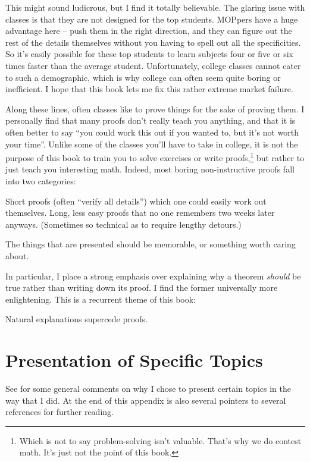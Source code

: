 This might sound ludicrous, but I find it totally believable.
The glaring issue with classes is that they are not designed for the top students.
MOPpers have a huge advantage here -- push them in the right direction,
and they can figure out the rest of the details themselves
without you having to spell out all the specificities.
So it's easily possible for these top students to learn subjects
four or five or six times faster than the average student.
Unfortunately, college classes cannot cater to such a demographic,
which is why college can often seem quite boring or inefficient.
I hope that this book lets me fix this rather extreme market failure.

Along these lines, often classes like to prove things for the sake of proving them.
I personally find that many proofs don't really teach you anything,
and that it is often better to say ``you could work this out if you wanted to, but it's not worth your time''.
Unlike some of the classes you'll have to take in college,
it is not the purpose of this book to train you to solve exercises or write proofs,\footnote{%
	Which is not to say problem-solving isn't valuable.
	That's why we do contest math.
	It's just not the point of this book.}
but rather to just teach you interesting math.
Indeed, most boring non-instructive proofs fall into two categories:
\begin{enumerate}[(i)]
	\ii Short proofs (often ``verify all details'') which one could easily work out themselves.
	\ii Long, less easy proofs that no one remembers two weeks later anyways.
	(Sometimes so technical as to require lengthy detours.)
\end{enumerate}
The things that are presented should be memorable, or something worth caring about.

In particular, I place a strong emphasis over explaining why a theorem \emph{should}
be true rather than writing down its proof.
I find the former universally more enlightening.
This is a recurrent theme of this book:
\begin{moral}
Natural explanations supercede proofs.
\end{moral}

\section*{Presentation of Specific Topics}
See  for some general comments on why I chose
to present certain topics in the way that I did.
At the end of this appendix is also several pointers to
several references for further reading.


